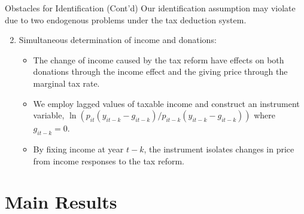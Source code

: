 \documentclass[
  ignorenonframetext,
]{beamer}
\providecommand{\tightlist}{%
  \setlength{\itemsep}{0pt}\setlength{\parskip}{0pt}}
\begin{document}
\begin{frame}{Obstacles for Identification (Cont'd)}
\protect\hypertarget{obstacles-for-identification-contd}{}
Our identification assumption may violate due to two endogenous problems under the tax deduction system.

\begin{enumerate}
\setcounter{enumi}{1}
\tightlist
\item
  Simultaneous determination of income and donations:

  \begin{itemize}
  \tightlist
  \item
    The change of income caused by the tax reform have effects on both donations through the income effect and the giving price through the marginal tax rate.
  \item
    We employ lagged values of taxable income and construct an instrument variable, \(\ln (p_{it}(y_{it-k} - g_{it-k})/p_{it-k}(y_{it-k} - g_{it-k}))\) where \(g_{it-k} = 0\).
  \item
    By fixing income at year \(t - k\), the instrument isolates changes in price from income responses to the tax reform.
  \end{itemize}
\end{enumerate}
\end{frame}

\hypertarget{main-results}{%
\section{Main Results}\label{main-results}}
\end{document}
